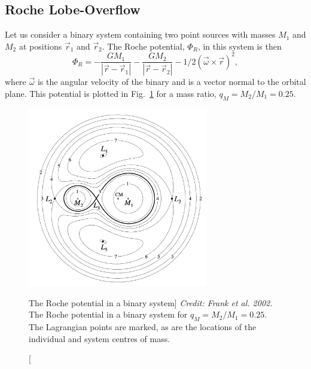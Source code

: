 \subsection{Roche Lobe-Overflow}
\label{sec:rlof}
Let us consider a binary system containing two point sources
with masses $M_1$ and $M_2$ at positions
$\vec{r}_1$ and $\vec{r}_2$. The Roche potential, $\Phi_R$, in this system 
is then
\begin{equation}
\Phi_R = - \frac{GM_1}{| \vec{r} - \vec{r}_1 |} - 
\frac{GM_2}{| \vec{r} - \vec{r}_2 |} - 1/2 (\vec{\omega} \times
 \vec{r})^2,
\label{eq:roche}
\end{equation} 
where $\vec{\omega}$ is the angular velocity of the binary and is a vector normal to
the orbital plane. This potential is plotted in Fig.~\ref{fig:roche} for a mass ratio, 
$q_M = M_2 / M_1 = 0.25$.

\begin{figure}
\centering
\includegraphics[width=0.7\textwidth]{figures/01-intro/roche_potential.png}
\caption
[The Roche potential in a binary system]
{
{\sl Credit: Frank et al. 2002.} 
The Roche potential in a binary system for $q_M = M_2 / M_1 = 0.25$.
The Lagrangian points are marked, as are the locations of the individual
and system centres of mass.
} 
\label{fig:roche}
\end{figure}

